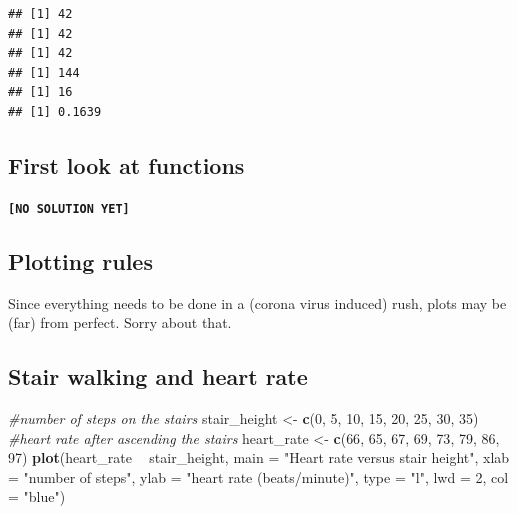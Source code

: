 \documentclass[]{book}
\newenvironment{Shaded}{\begin{snugshade}}{\end{snugshade}}
\newcommand{\CommentTok}[1]{\textcolor[rgb]{0.56,0.35,0.01}{\textit{#1}}}
\newcommand{\DataTypeTok}[1]{\textcolor[rgb]{0.13,0.29,0.53}{#1}}
\newcommand{\DecValTok}[1]{\textcolor[rgb]{0.00,0.00,0.81}{#1}}
\newcommand{\KeywordTok}[1]{\textcolor[rgb]{0.13,0.29,0.53}{\textbf{#1}}}
\newcommand{\NormalTok}[1]{#1}
\newcommand{\OperatorTok}[1]{\textcolor[rgb]{0.81,0.36,0.00}{\textbf{#1}}}
\newcommand{\StringTok}[1]{\textcolor[rgb]{0.31,0.60,0.02}{#1}}
\begin{document}
\begin{verbatim}
## [1] 42
## [1] 42
## [1] 42
## [1] 144
## [1] 16
## [1] 0.1639
\end{verbatim}

\hypertarget{first-look-at-functions-1}{%
\subsection{First look at functions}\label{first-look-at-functions-1}}

\textbf{\texttt{{[}NO\ SOLUTION\ YET{]}}}

\hypertarget{plotting-rules-1}{%
\subsection*{Plotting rules}\label{plotting-rules-1}}

Since everything needs to be done in a (corona virus induced) rush, plots may be (far) from perfect. Sorry about that.

\hypertarget{stair-walking-and-heart-rate-1}{%
\subsection{Stair walking and heart rate}\label{stair-walking-and-heart-rate-1}}

\begin{Shaded}
\begin{Highlighting}[]
\CommentTok{#number of steps on the stairs}
\NormalTok{stair_height <-}\StringTok{ }\KeywordTok{c}\NormalTok{(}\DecValTok{0}\NormalTok{, }\DecValTok{5}\NormalTok{, }\DecValTok{10}\NormalTok{, }\DecValTok{15}\NormalTok{, }\DecValTok{20}\NormalTok{, }\DecValTok{25}\NormalTok{, }\DecValTok{30}\NormalTok{, }\DecValTok{35}\NormalTok{)}
\CommentTok{#heart rate after ascending the stairs}
\NormalTok{heart_rate <-}\StringTok{ }\KeywordTok{c}\NormalTok{(}\DecValTok{66}\NormalTok{, }\DecValTok{65}\NormalTok{, }\DecValTok{67}\NormalTok{, }\DecValTok{69}\NormalTok{, }\DecValTok{73}\NormalTok{, }\DecValTok{79}\NormalTok{, }\DecValTok{86}\NormalTok{, }\DecValTok{97}\NormalTok{)}
\KeywordTok{plot}\NormalTok{(heart_rate }\OperatorTok{~}\StringTok{ }\NormalTok{stair_height,}
      \DataTypeTok{main =} \StringTok{"Heart rate versus stair height"}\NormalTok{,}
      \DataTypeTok{xlab =} \StringTok{"number of steps"}\NormalTok{,}
      \DataTypeTok{ylab =} \StringTok{"heart rate (beats/minute)"}\NormalTok{,}
      \DataTypeTok{type =} \StringTok{"l"}\NormalTok{,}
      \DataTypeTok{lwd =} \DecValTok{2}\NormalTok{,}
      \DataTypeTok{col =} \StringTok{"blue"}\NormalTok{)}
\end{Highlighting}
\end{Shaded}
\end{document}
